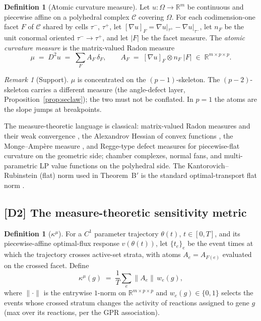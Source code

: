 \documentclass[11pt,a4paper]{article}
\theoremstyle{plain}
\theoremstyle{definition}
\newtheorem{definition}[theorem]{Definition}
\theoremstyle{remark}
\newtheorem{remark}[theorem]{Remark}
\newcommand{\kmu}{\kappa^{\mu}}
\newcommand{\CC}{\mathcal{C}}
\newcommand{\RR}{\mathbb{R}}
\begin{document}
\begin{definition}[Atomic curvature measure]\label{def:mu}
Let $u : \Omega \to \RR^m$ be continuous and piecewise affine on a
polyhedral complex $\CC$ covering $\Omega$. For each codimension-one facet
$F$ of $\CC$ shared by cells $\tau^-$, $\tau^+$, let
$[\nabla u]_F = \nabla u|_{\tau^+} - \nabla u|_{\tau^-}$, let $n_F$ be the
unit conormal oriented $\tau^- \to \tau^+$, and let $|F|$ be the facet
measure. The \emph{atomic curvature measure} is the matrix-valued Radon
measure
\[
\mu \;=\; D^2 u \;=\; \sum_{F} A_F \, \delta_F,
\qquad
A_F \;=\; [\nabla u]_F \otimes n_F \; |F| \;\in\; \RR^{m \times p \times p}.
\]
\end{definition}

\begin{remark}[Support]\label{rem:support}
$\mu$ is concentrated on the $(p-1)$-skeleton. The $(p-2)$-skeleton carries
a different measure (the angle-defect layer,
Proposition~\ref{prop:seclaw}); the two must not be conflated. In $p=1$ the
atoms are the slope jumps at breakpoints.
\end{remark}

The measure-theoretic language is classical: matrix-valued Radon
measures and their weak convergence \citep{billingsley1999}, the
Alexandrov Hessian of convex functions \citep{alexandrov1939}, the
Monge--Amp\`ere measure \citep{gutierrez2001}, and Regge-type defect
measures for piecewise-flat curvature \citep{regge1961, cheeger1984} on
the geometric side; chamber complexes, normal fans, and multi-parametric
LP value functions \citep{rockafellar1970, ziegler1995, borrelli2003} on
the polyhedral side. The Kantorovich--Rubinstein (flat) norm used in
Theorem~B$'$ is the standard optimal-transport flat norm
\citep{villani2009}.

\subsection{[D2] The measure-theoretic sensitivity metric}

\begin{definition}[$\kmu$]\label{def:kmu}
For a $C^1$ parameter trajectory $\theta(t)$, $t \in [0,T]$, and its
piecewise-affine optimal-flux response $v(\theta(t))$, let
$\{t_e\}_e$ be the event times at which the trajectory crosses active-set
strata, with atoms $A_e = A_{F(e)}$ evaluated on the crossed facet. Define
\[
\kmu(g) \;=\; \frac{1}{T}\sum_{e} \bigl\| A_e \bigr\| \, w_e(g),
\]
where $\|{\cdot}\|$ is the entrywise $1$-norm on
$\RR^{m \times p \times p}$ and $w_e(g) \in \{0,1\}$ selects the events
whose crossed stratum changes the activity of reactions assigned to gene
$g$ (max over its reactions, per the GPR association).
\end{definition}
\end{document}
